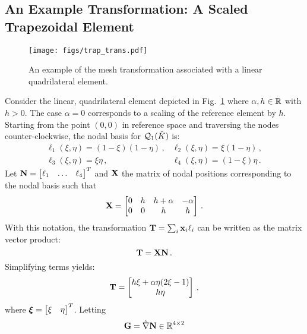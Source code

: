 \documentclass[../doc.tex]{subfiles}
\begin{document}
\subsection{An Example Transformation: A Scaled Trapezoidal Element}
\begin{figure}
\centering
\texttt{[image: figs/trap\_trans.pdf]}
\caption{An example of the mesh transformation associated with a linear quadrilateral element. }
\label{fem:trap_trans}
\end{figure}
Consider the linear, quadrilateral element depicted in Fig.~\ref{fem:trap_trans} where $\alpha,h\in \mathbb{R}$ with $h>0$. The case $\alpha = 0$ corresponds to a scaling of the reference element by $h$. Starting from the point $(0,0)$ in reference space and traversing the nodes counter-clockwise, the nodal basis for $\mathcal{Q}_{1}(\hat{K})$ is: 
	\begin{equation}
		\begin{array}{cc}
			\ell_1(\xi,\eta) = (1-\xi)(1-\eta)\,, & \ell_2(\xi,\eta) = \xi(1-\eta)\,,\\[2pt] \ell_3(\xi,\eta) = \xi\eta\,, & \ell_4(\xi,\eta) = (1-\xi)\eta\,. 
		\end{array} 
	\end{equation}
Let $\boldsymbol{\mathrm{N}} = \begin{bmatrix} \ell_1 & \ldots & \ell_4 \end{bmatrix}^T$ and $\boldsymbol{\mathrm{X}}$ the matrix of nodal positions corresponding to the nodal basis such that 
	\begin{equation}
		\boldsymbol{\mathrm{X}} = \begin{bmatrix} 
			0 & h & h + \alpha & -\alpha \\ 
			0 & 0 & h & h 
		\end{bmatrix} \,. 
	\end{equation}
With this notation, the transformation $\boldsymbol{\mathrm{T}} = \sum_i \boldsymbol{\mathrm{x}}_i \ell_i$ can be written as the matrix vector product: 
	\begin{equation}
		\boldsymbol{\mathrm{T}} = \boldsymbol{\mathrm{X}} \boldsymbol{\mathrm{N}} \,. 
	\end{equation}
Simplifying terms yields: 
	\begin{equation}
		\boldsymbol{\mathrm{T}} = \begin{bmatrix} 
			h \xi + \alpha \eta(2\xi - 1) \\ 
			h \eta 
		\end{bmatrix} \,, 
	\end{equation}
where $\boldsymbol{\xi} = \begin{bmatrix} \xi & \eta \end{bmatrix}^T$. Letting 
	\begin{equation}
		\boldsymbol{\mathrm{G}} = \hat{\nabla} \boldsymbol{\mathrm{N}} \in \mathbb{R}^{4\times 2} 
	\end{equation}
\end{document}
